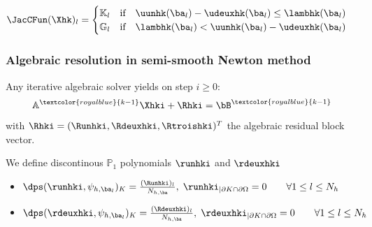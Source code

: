 \documentclass[10 pt]{beamer}
\begin{document}
\begin{frame}
\begin{equation*}
\JacCFun(\Xhk)_l
=
\begin{cases}
\mathbb{K}_l \quad \mbox{if} \quad \uunhk(\ba_l)-\udeuxhk(\ba_l) \leq \lambhk(\ba_l)\\
\mathbb{G}_l \quad \mbox{if} \quad \lambhk(\ba_l) < \uunhk(\ba_l)-\udeuxhk(\ba_l)
\end{cases}
\end{equation*}

\end{frame}
\begin{frame}
\frametitle{Algebraic resolution in semi-smooth Newton method}
Any iterative algebraic
solver yields on step $i \geq 0$:
\begin{equation*}
\mathbb{A}^{\textcolor{royalblue}{k-1}}\Xhki + \Rhki=\bB^{\textcolor{royalblue}{k-1}}
\end{equation*}
with $\Rhki=(\Runhki,\Rdeuxhki,\Rtroishki)^{T}$ the algebraic residual block vector.
\begin{definition}
We define discontinous $\mathbb{P}_1$ polynomials $\runhki$ and $\rdeuxhki$ %
\begin{itemize}
\item $\dps (\runhki, \psi_{h,\ba_l})_K=\frac{(\Runhki)_l}{N_{h,\ba}}, \; {\runhki}_{|\partial K \cap \partial \Omega} =0 \qquad \forall 1 \leq l \leq N_h$
\item $\dps (\rdeuxhki, \psi_{h,\ba_l})_K=\frac{(\Rdeuxhki)_l}{N_{h,\ba}}, \; {\rdeuxhki}_{|\partial K \cap \partial \Omega} =0 \qquad \forall 1 \leq l \leq N_h$
\end{itemize}
\end{definition}


\end{frame}
\end{document}
